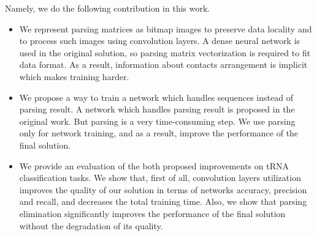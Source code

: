Namely, we do the following contribution in this work.
\begin{itemize}
\item We represent parsing matrices as bitmap images to preserve data locality and to process such images using convolution layers. 
A dense neural network is used in the original solution, so parsing matrix vectorization is required to fit data format. 
As a result, information about contacts arrangement is implicit which makes training harder.
\item  We propose a way to train a network which handles sequences instead of parsing result.
A network which handles parsing result is proposed in the original work. But parsing is a very time-consuming step. 
We use parsing only for network training, and as a result, improve the performance of the final solution.
\item We provide an evaluation of the both proposed improvements on tRNA classification tasks. 
We show that, first of all, convolution layers utilization improves the quality of our solution in terms of networks accuracy, precision and recall, and decreases the total training time.
Also, we show that parsing elimination significantly improves the performance of the final solution without the degradation of its quality.
\end{itemize}